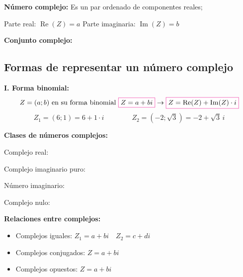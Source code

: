 \documentclass[11pt,a4paper]{article}
\begin{document}
\textbf{Número complejo:} Es un par ordenado de componentes reales;
\ 

\qquad \textcolor{azul}{Parte real:} $\operatorname{Re}(Z) = a$ \qquad
\textcolor{azul}{Parte imaginaria:} $\operatorname{Im}(Z) = b$

\textcolor{naranja}{\textbf{Conjunto complejo:}} \quad
{}

\subsection*{Formas de representar un número complejo}

\textbf{I. Forma binomial:}
\[
Z = (a;b) \text{ en su forma binomial } \fcolorbox{magenta}{white}{$Z = a + bi$}
\rightarrow \fcolorbox{magenta}{white}{$Z = \operatorname{Re}(Z) + \operatorname{Im}(Z)\cdot i$}
\]
\[
Z_1 = (6;1) = 6 + 1\cdot i \qquad\qquad Z_2 = (-2;\sqrt{3}) = -2 + \sqrt{3}\,i
\]

\textcolor{rojo}{\textbf{Clases de números complejos:}}

\begin{minipage}[t]{0.485\textwidth}
\textcolor{azul}{Complejo real:} \ 

\textcolor{azul}{Complejo imaginario puro:} \ 
\end{minipage}\hfill
\begin{minipage}[t]{0.485\textwidth}
\textcolor{azul}{Número imaginario:} \ 

\textcolor{azul}{Complejo nulo:} \ 
\end{minipage}

\medskip
\textcolor{rojo}{\textbf{Relaciones entre complejos:}}
\begin{itemize}[label={}]
  \item \textcolor{azul}{Complejos iguales:} $Z_1 = a + bi \quad Z_2 = c + di$ \quad
  \item \textcolor{azul}{Complejos conjugados:} $Z = a + bi$ \quad
  \item \textcolor{azul}{Complejos opuestos:} $Z = a + bi$ \quad
\end{itemize}
\end{document}
